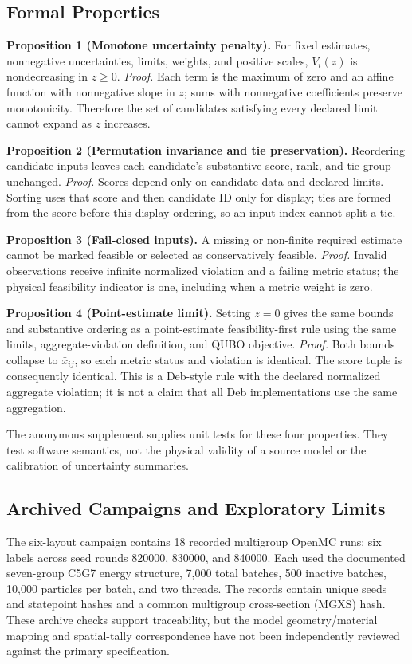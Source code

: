 \documentclass[conference]{IEEEtran}
\begin{document}
\subsection{Formal Properties}
\noindent\textbf{Proposition 1 (Monotone uncertainty penalty).} For fixed estimates, nonnegative uncertainties, limits, weights, and positive scales, $V_i(z)$ is nondecreasing in $z\geq0$. \emph{Proof.} Each term is the maximum of zero and an affine function with nonnegative slope in $z$; sums with nonnegative coefficients preserve monotonicity. Therefore the set of candidates satisfying every declared limit cannot expand as $z$ increases.

\noindent\textbf{Proposition 2 (Permutation invariance and tie preservation).} Reordering candidate inputs leaves each candidate's substantive score, rank, and tie-group unchanged. \emph{Proof.} Scores depend only on candidate data and declared limits. Sorting uses that score and then candidate ID only for display; ties are formed from the score before this display ordering, so an input index cannot split a tie.

\noindent\textbf{Proposition 3 (Fail-closed inputs).} A missing or non-finite required estimate cannot be marked feasible or selected as conservatively feasible. \emph{Proof.} Invalid observations receive infinite normalized violation and a failing metric status; the physical feasibility indicator is one, including when a metric weight is zero.

\noindent\textbf{Proposition 4 (Point-estimate limit).} Setting $z=0$ gives the same bounds and substantive ordering as a point-estimate feasibility-first rule using the same limits, aggregate-violation definition, and QUBO objective. \emph{Proof.} Both bounds collapse to $\bar{x}_{ij}$, so each metric status and violation is identical. The score tuple is consequently identical. This is a Deb-style rule with the declared normalized aggregate violation; it is not a claim that all Deb implementations use the same aggregation.

The anonymous supplement supplies unit tests for these four properties. They test software semantics, not the physical validity of a source model or the calibration of uncertainty summaries.

\subsection{Archived Campaigns and Exploratory Limits}
The six-layout campaign contains 18 recorded multigroup OpenMC runs: six labels across seed rounds 820000, 830000, and 840000. Each used the documented seven-group C5G7 energy structure, 7,000 total batches, 500 inactive batches, 10,000 particles per batch, and two threads. The records contain unique seeds and statepoint hashes and a common multigroup cross-section (MGXS) hash. These archive checks support traceability, but the model geometry/material mapping and spatial-tally correspondence have not been independently reviewed against the primary specification.
\end{document}
